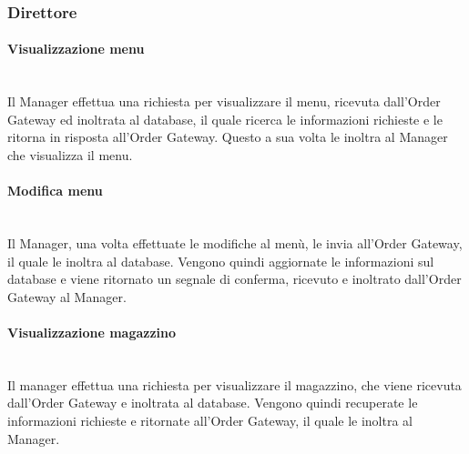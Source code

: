 \subsubsection{Direttore}

\paragraph{Visualizzazione menu}\mbox{}\\
Il Manager effettua una richiesta per visualizzare il menu, ricevuta dall’Order Gateway ed inoltrata al database, il quale ricerca le informazioni richieste e le ritorna in risposta all’Order Gateway. Questo a sua volta le inoltra al Manager che visualizza il menu.

\paragraph{Modifica menu}\mbox{}\\
Il Manager, una volta effettuate le modifiche al menù, le invia all’Order Gateway, il quale le inoltra al database. Vengono quindi aggiornate le informazioni sul database e viene ritornato un segnale di conferma, ricevuto e inoltrato dall’Order Gateway al Manager.

\paragraph{Visualizzazione magazzino}\mbox{}\\
Il manager effettua una richiesta per visualizzare il magazzino, che viene ricevuta dall’Order Gateway e inoltrata al database. Vengono quindi recuperate le informazioni richieste e ritornate all’Order Gateway, il quale le inoltra al Manager.

